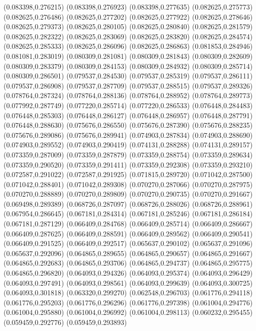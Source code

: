 (0.083398,0.276215)
(0.083398,0.276923)
(0.083398,0.277635)
(0.082625,0.275773)
(0.082625,0.276486)
(0.082625,0.277202)
(0.082625,0.277922)
(0.082625,0.278646)
(0.082625,0.279373)
(0.082625,0.280105)
(0.082625,0.280840)
(0.082625,0.281579)
(0.082625,0.282322)
(0.082625,0.283069)
(0.082625,0.283820)
(0.082625,0.284574)
(0.082625,0.285333)
(0.082625,0.286096)
(0.082625,0.286863)
(0.081853,0.284946)
(0.081081,0.283019)
(0.080309,0.281081)
(0.080309,0.281843)
(0.080309,0.282609)
(0.080309,0.283379)
(0.080309,0.284153)
(0.080309,0.284932)
(0.080309,0.285714)
(0.080309,0.286501)
(0.079537,0.284530)
(0.079537,0.285319)
(0.079537,0.286111)
(0.079537,0.286908)
(0.079537,0.287709)
(0.079537,0.288515)
(0.079537,0.289326)
(0.078764,0.287324)
(0.078764,0.288136)
(0.078764,0.288952)
(0.078764,0.289773)
(0.077992,0.287749)
(0.077220,0.285714)
(0.077220,0.286533)
(0.076448,0.284483)
(0.076448,0.285303)
(0.076448,0.286127)
(0.076448,0.286957)
(0.076448,0.287791)
(0.076448,0.288630)
(0.075676,0.286550)
(0.075676,0.287390)
(0.075676,0.288235)
(0.075676,0.289086)
(0.075676,0.289941)
(0.074903,0.287834)
(0.074903,0.288690)
(0.074903,0.289552)
(0.074903,0.290419)
(0.074131,0.288288)
(0.074131,0.289157)
(0.073359,0.287009)
(0.073359,0.287879)
(0.073359,0.288754)
(0.073359,0.289634)
(0.073359,0.290520)
(0.073359,0.291411)
(0.073359,0.292308)
(0.073359,0.293210)
(0.072587,0.291022)
(0.072587,0.291925)
(0.071815,0.289720)
(0.071042,0.287500)
(0.071042,0.288401)
(0.071042,0.289308)
(0.070270,0.287066)
(0.070270,0.287975)
(0.070270,0.288889)
(0.070270,0.289809)
(0.070270,0.290735)
(0.070270,0.291667)
(0.069498,0.289389)
(0.068726,0.287097)
(0.068726,0.288026)
(0.068726,0.288961)
(0.067954,0.286645)
(0.067181,0.284314)
(0.067181,0.285246)
(0.067181,0.286184)
(0.067181,0.287129)
(0.066409,0.284768)
(0.066409,0.285714)
(0.066409,0.286667)
(0.066409,0.287625)
(0.066409,0.288591)
(0.066409,0.289562)
(0.066409,0.290541)
(0.066409,0.291525)
(0.066409,0.292517)
(0.065637,0.290102)
(0.065637,0.291096)
(0.065637,0.292096)
(0.064865,0.289655)
(0.064865,0.290657)
(0.064865,0.291667)
(0.064865,0.292683)
(0.064865,0.293706)
(0.064865,0.294737)
(0.064865,0.295775)
(0.064865,0.296820)
(0.064093,0.294326)
(0.064093,0.295374)
(0.064093,0.296429)
(0.064093,0.297491)
(0.064093,0.298561)
(0.064093,0.299639)
(0.064093,0.300725)
(0.064093,0.301818)
(0.063320,0.299270)
(0.062548,0.296703)
(0.061776,0.294118)
(0.061776,0.295203)
(0.061776,0.296296)
(0.061776,0.297398)
(0.061004,0.294776)
(0.061004,0.295880)
(0.061004,0.296992)
(0.061004,0.298113)
(0.060232,0.295455)
(0.059459,0.292776)
(0.059459,0.293893)
